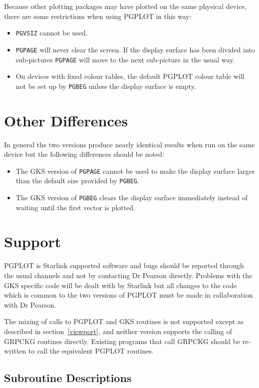 \documentclass[twoside,11pt]{article}
\newcommand{\hyperref}[4]{#2\ref{#4}#3}
\newcommand{\xref}[3]{#1}
\newcommand{\xlabel}[1]{}
\renewcommand{\_}{\texttt{\symbol{95}}}
\begin{document}
Because other plotting packages may have plotted on the same physical device,
there are some restrictions when using PGPLOT in this way:

\begin{itemize}
\item \xref{\texttt{PGVSIZ}}{sun15}{PGVSIZ} cannot be used.

\item \xref{\texttt{PGPAGE}}{sun15}{PGPAGE} will never clear the
screen.  If the display surface has been divided into sub-pictures
\texttt{PGPAGE} will move to the next sub-picture in the usual way.

\item On devices with fixed colour tables, the default PGPLOT colour
table will not be set up by \xref{\texttt{PGBEG}}{sun15}{PGBEG} unless the
display surface is empty.

\end{itemize}

\section{\xlabel{other_differences}Other Differences}
\label{other_differences}

In general the two versions produce nearly identical results when run on
the same device but the following differences should be noted:

\begin{itemize}
\item The GKS version of \xref{\texttt{PGPAGE}}{sun15}{PGPAGE} cannot be
used to make the display surface larger than the default size provided by
\xref{\texttt{PGBEG}}{sun15}{PGBEG}.
\item The GKS version of \texttt{PGBEG} clears the display surface immediately
instead of waiting until the first vector is plotted.
\end{itemize}

\section{\xlabel{support}Support}
\label{support}

PGPLOT is Starlink supported software and bugs should be reported through the
usual channels and not by contacting Dr Pearson directly. Problems with the GKS
specific code will be dealt with by Starlink but all changes to the code which
is common to the two versions of PGPLOT must be made in collaboration with Dr
Pearson.

The mixing of calls to PGPLOT and GKS routines is not supported except as
described in \hyperref{this section}{section~}{}{viewport}, and neither
version supports the calling of GRPCKG routines directly. Existing programs
that call GRPCKG should be re-written to call the equivalent PGPLOT routines.

\begin{htmlonly}
\appendix
\section{Subroutine Descriptions}

\end{htmlonly}

\end{document}
